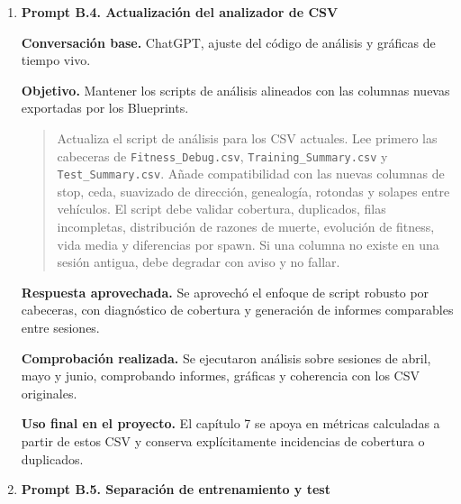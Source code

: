 {\begin{enumerate}[leftmargin=*,itemsep=0.2\baselineskip,topsep=2pt,parsep=0pt,partopsep=0pt]
  \textbf{Respuesta aprovechada.} Se aprovechó el análisis de interacción entre penalización acumulada, velocidad casi nula, contexto \texttt{ForceStop} y reinicio de contadores.

  \textbf{Comprobación realizada.} Se contrastó con registros de navegación fuera de calzada, finalizaciones por tiempo, penalizaciones acumuladas y ausencia de muertes \texttt{NAV\_VIOLATION} en determinadas sesiones.

  \textbf{Uso final en el proyecto.} La memoria incorpora la salida de calzada como problema de acumulación temporal y de penalización, y no como simple colisión geométrica.

  \item \textbf{Prompt B.4. Actualización del analizador de CSV}

  \textbf{Conversación base.} ChatGPT, ajuste del código de análisis y gráficas de tiempo vivo.

  \textbf{Objetivo.} Mantener los scripts de análisis alineados con las columnas nuevas exportadas por los Blueprints.

  \promptDepurado
  \begin{quote}
  \small
  Actualiza el script de análisis para los CSV actuales. Lee primero las cabeceras de \texttt{Fitness\_Debug.csv}, \texttt{Training\_Summary.csv} y \texttt{Test\_Summary.csv}. Añade compatibilidad con las nuevas columnas de stop, ceda, suavizado de dirección, genealogía, rotondas y solapes entre vehículos. El script debe validar cobertura, duplicados, filas incompletas, distribución de razones de muerte, evolución de fitness, vida media y diferencias por spawn. Si una columna no existe en una sesión antigua, debe degradar con aviso y no fallar.
  \end{quote}

  \textbf{Respuesta aprovechada.} Se aprovechó el enfoque de script robusto por cabeceras, con diagnóstico de cobertura y generación de informes comparables entre sesiones.

  \textbf{Comprobación realizada.} Se ejecutaron análisis sobre sesiones de abril, mayo y junio, comprobando informes, gráficas y coherencia con los CSV originales.

  \textbf{Uso final en el proyecto.} El capítulo 7 se apoya en métricas calculadas a partir de estos CSV y conserva explícitamente incidencias de cobertura o duplicados.

  \item \textbf{Prompt B.5. Separación de entrenamiento y test}


\end{enumerate}}
